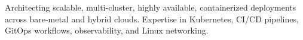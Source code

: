 \vspace{-0.25cm} %
\vspace{-0.2cm} 

\begin{cvparagraph}
  Architecting scalable, multi-cluster, highly available, containerized deployments across bare-metal and hybrid clouds. Expertise in Kubernetes, CI/CD pipelines, GitOps workflows, observability, and Linux networking.
\end{cvparagraph}